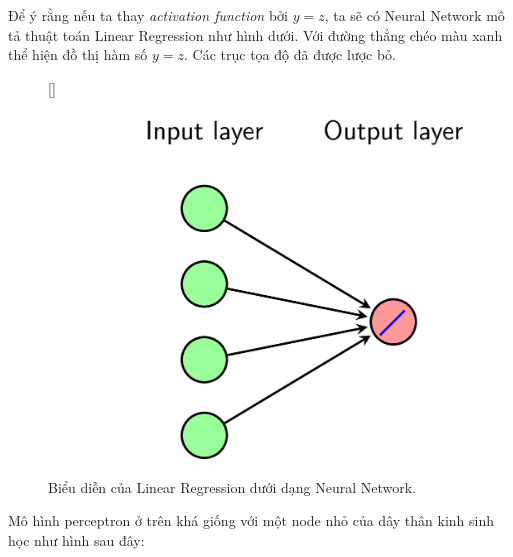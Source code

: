 Để ý rằng nếu ta thay \textit{activation function} bởi $y = z$, ta sẽ có Neural Network mô tả thuật toán Linear Regression như hình dưới. Với đường thẳng chéo màu xanh thể hiện đồ thị hàm số $y = z$. Các trục tọa độ đã được lược bỏ. 
 

\begin{figure}[t]
    [\FBwidth]
    {\caption{ 
    Biểu diễn của Linear Regression dưới dạng Neural Network.
    }
    \label{fig:9_6}}
    { %
    \includegraphics[width=.5\textwidth]{Chapters/05_NeuralNetworks/09_perceptron/lr_nn.png}
    }
\end{figure}

 
Mô hình perceptron ở trên khá giống với một node nhỏ của dây thân kinh sinh học như hình sau đây: 
 

    

